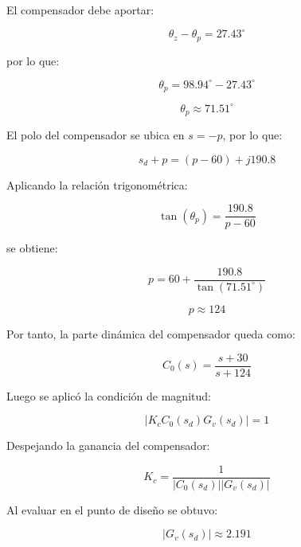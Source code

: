 \documentclass[journal]{IEEEtran}
\begin{document}
El compensador debe aportar:

\begin{equation}
\theta_z-\theta_p=27.43^\circ
\end{equation}

por lo que:

\begin{equation}
\theta_p=98.94^\circ-27.43^\circ
\end{equation}

\begin{equation}
\theta_p\approx71.51^\circ
\end{equation}

El polo del compensador se ubica en $s=-p$, por lo que:

\begin{equation}
s_d+p=(p-60)+j190.8
\end{equation}

Aplicando la relación trigonométrica:

\begin{equation}
\tan(\theta_p)=\frac{190.8}{p-60}
\end{equation}

se obtiene:

\begin{equation}
p=60+\frac{190.8}{\tan(71.51^\circ)}
\end{equation}

\begin{equation}
p\approx124
\end{equation}

Por tanto, la parte dinámica del compensador queda como:

\begin{equation}
C_0(s)=\frac{s+30}{s+124}
\end{equation}

Luego se aplicó la condición de magnitud:

\begin{equation}
|K_cC_0(s_d)G_v(s_d)|=1
\end{equation}

Despejando la ganancia del compensador:

\begin{equation}
K_c=\frac{1}{|C_0(s_d)||G_v(s_d)|}
\end{equation}

Al evaluar en el punto de diseño se obtuvo:

\begin{equation}
|G_v(s_d)|\approx2.191
\end{equation}
\end{document}
